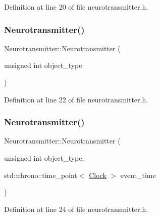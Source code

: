 Definition at line 20 of file neurotransmitter.\+h.

\mbox{\label{class_neurotransmitter_adca6f02b1a9c98d269e3909e1e2f0463}} 
\subsubsection{\texorpdfstring{Neurotransmitter()}{Neurotransmitter()}\hspace{0.1cm}{\footnotesize\ttfamily [2/4]}}
{\footnotesize\ttfamily Neurotransmitter\+::\+Neurotransmitter (\begin{DoxyParamCaption}\item[{unsigned int}]{object\+\_\+type }\end{DoxyParamCaption})\hspace{0.3cm}{\ttfamily [inline]}}



Definition at line 22 of file neurotransmitter.\+h.

\mbox{\label{class_neurotransmitter_ac1c768a2769536a8a16569ae0dde1671}} 
\subsubsection{\texorpdfstring{Neurotransmitter()}{Neurotransmitter()}\hspace{0.1cm}{\footnotesize\ttfamily [3/4]}}
{\footnotesize\ttfamily Neurotransmitter\+::\+Neurotransmitter (\begin{DoxyParamCaption}\item[{unsigned int}]{object\+\_\+type,  }\item[{std\+::chrono\+::time\+\_\+point$<$ \mbox{\hyperlink{universe_8h_a0ef8d951d1ca5ab3cfaf7ab4c7a6fd80}{Clock}} $>$}]{event\+\_\+time }\end{DoxyParamCaption})\hspace{0.3cm}{\ttfamily [inline]}}



Definition at line 24 of file neurotransmitter.\+h.

\mbox{\label{class_neurotransmitter_ac9257a1b310a26eba8a08ffb4b93bb64}} 
